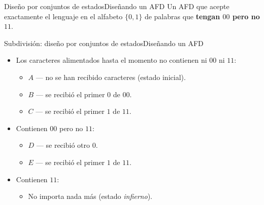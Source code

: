 \documentclass[spanish]{beamer}
\begin{document}
\begin{frame}{Diseño por conjuntos de estados}{Diseñando un AFD}
    Un AFD que acepte exactamente el lenguaje en el alfabeto $\{0,1\}$ de palabras que \textbf{tengan $00$ pero no $11$}.
    \begin{center}
    \end{center}
\end{frame}

\begin{frame}{Subdivisión: diseño por conjuntos de estados}{Diseñando un AFD}
    \begin{itemize}
        \itemsep1.5ex
        \item Los caracteres alimentados hasta el momento no contienen ni $00$ ni $11$: \pause
        \begin{itemize}
            \item $A$ --- no se han recibido caracteres (estado inicial). \pause
            \item $B$ --- se recibió el primer $0$ de $00$. \pause
            \item $C$ --- se recibió el primer $1$ de $11$. \pause
        \end{itemize}
        \item Contienen $00$ pero no $11$: \pause
        \begin{itemize}
            \item $D$ --- se recibió otro $0$. \pause
            \item $E$ --- se recibió el primer $1$ de $11$. \pause
        \end{itemize}
        \item Contienen $11$: \pause
            \begin{itemize}
                \item No importa nada más (estado \textit{infierno}).
            \end{itemize}
    \end{itemize}
\end{frame}
\end{document}
